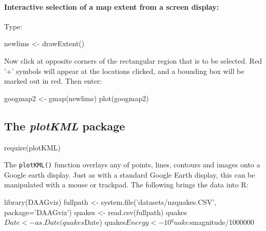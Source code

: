 \documentclass{tufte-book}\usepackage[]{graphicx}\usepackage[]{color}
\newcommand{\txtt}[1]{\texttt{#1}}
\begin{document}
\paragraph{Interactive selection of a map extent from a screen display:}
Type:
\begin{Schunk}
\begin{Sinput}
newlims <- drawExtent()
\end{Sinput}
\end{Schunk}
Now click at opposite corners  of the rectangular region
that is to be selected.  Red '+' symbols will appear at the locations
clicked, and a bounding box will be marked out in red.  Then enter:
\begin{Schunk}
\begin{Sinput}
googmap2 <- gmap(newlims)
plot(googmap2)
\end{Sinput}
\end{Schunk}

\subsection{The {\em plotKML} package}

\begin{Schunk}
\begin{Sinput}
require(plotKML)
\end{Sinput}
\end{Schunk}

The \txtt{plotKML()} function overlays any of points, lines, contours
and images onto a Google earth display.  Just as with a standard
Google Earth display, this can be manipulated with a mouse or
trackpad.  The following brings the data into R:
\begin{Schunk}
\begin{Sinput}
library(DAAGviz)
fullpath <- system.file('datasets/nzquakes.CSV',
                        package='DAAGviz')
quakes <- read.csv(fullpath)
quakes$Date <- as.Date(quakes$Date)
quakes$Energy <- 10^quakes$magnitude/1000000
\end{Sinput}
\end{Schunk}
\end{document}
